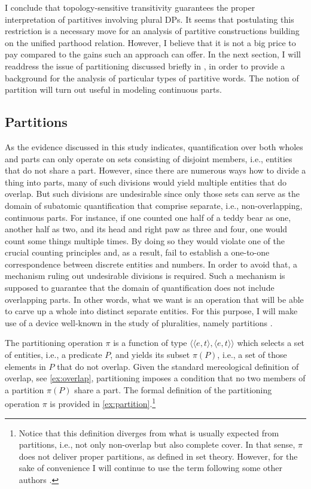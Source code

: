 	I conclude that topology-sensitive transitivity guarantees the proper interpretation of partitives involving plural DPs. It seems that postulating this restriction is a necessary move for an analysis of partitive constructions building on the unified parthood relation. However, I believe that it is not a big price to pay compared to the gains such an approach can offer. In the next section, I will readdress the issue of partitioning discussed briefly in  , in order to provide a background for the analysis of particular types of partitive words. The notion of partition will turn out useful in modeling continuous parts.
	
	\subsection{Partitions}\label{sec:partitions}\largerpage
	
	As the evidence discussed in this study indicates, quantification over both wholes and parts can only operate on sets consisting of disjoint members, i.e., entities that do not share a part. However, since there are numerous ways how to divide a thing into parts, many of such divisions would yield multiple entities that do overlap. But such divisions are undesirable since only those sets can serve as the domain of subatomic quantification that comprise separate, i.e., non-overlapping, continuous parts. For instance, if one counted one half of a teddy bear as one, another half as two, and its head and right paw as three and four, one would count some things multiple times. By doing so they would violate one of the crucial counting principles and, as a result, fail to establish a one-to-one correspondence between discrete entities and numbers. In order to avoid that, a mechanism ruling out undesirable divisions is required. Such a mechanism is supposed to guarantee that the domain of quantification does not include overlapping parts. In other words, what we want is an operation that will be able to carve up a whole into distinct separate entities. For this purpose, I will make use of a device well-known in the study of pluralities, namely partitions \citep[see, e.g,][]{schwarzschild1996pluralities,chierchia2010mass}. 
	
	The partitioning operation $\pi$ is a function of type $\langle\langle e, t\rangle, \langle e, t\rangle\rangle$ which selects a set of entities, i.e., a predicate $P$, and yields its subset $\pi(P)$, i.e., a set of those elements in $P$ that do not overlap. Given the standard mereological definition of overlap, see \ref{ex:overlap}, partitioning imposes a condition that no two members of a partition $\pi(P)$ share a part. The formal definition of the partitioning operation $\pi$ is provided in \ref{ex:partition}.\footnote{Notice that this definition diverges from what is usually expected from partitions, i.e., not only non-overlap but also complete cover. In that sense, $\pi$ does not deliver proper partitions, as defined in set theory. However, for the sake of convenience I will continue to use the term following some other authors \citep[e.g.,][]{scontras2014semantics}.}

